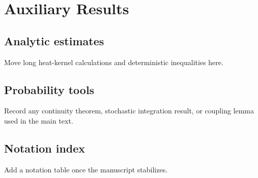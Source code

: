 \section{Auxiliary Results}

\subsection{Analytic estimates}

\begin{draftnote}
Move long heat-kernel calculations and deterministic inequalities here.
\end{draftnote}

\subsection{Probability tools}

\begin{draftnote}
Record any continuity theorem, stochastic integration result, or coupling
lemma used in the main text.
\end{draftnote}

\subsection{Notation index}

\begin{draftnote}
Add a notation table once the manuscript stabilizes.
\end{draftnote}
